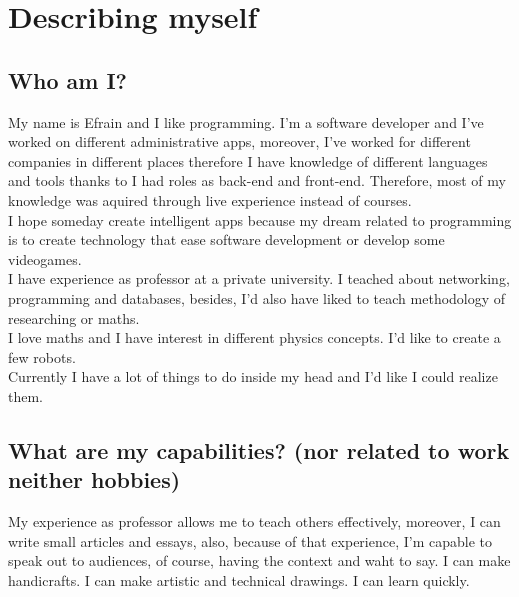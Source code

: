 \section{Describing myself}

\subsection{Who am I?}
\begin{multicols}{2}
My name is Efrain and I like programming. I'm a software developer and I've worked on different administrative apps, moreover, I've worked for different companies in different places therefore I have knowledge of different languages and tools thanks to I had roles as back-end and front-end. Therefore, most of my knowledge was aquired through live experience instead of courses.\\
I hope someday create intelligent apps because my dream related to programming is to create technology that ease software development or develop some videogames.\\
I have experience as professor at a private university. I teached about networking, programming and databases, besides, I'd also have liked to teach methodology of researching or maths.\\
I love maths and I have interest in different physics concepts. I'd like to create a few robots.\\
Currently I have a lot of things to do inside my head and I'd like I could realize them.
\end{multicols}

\subsection{What are my capabilities? (nor related to work neither hobbies)}
\begin{multicols}{2}
My experience as professor allows me to teach others effectively, moreover, I can write small articles and essays, also, because of that experience, I'm capable to speak out to audiences, of course, having the context and waht to say. I can make handicrafts. I can make artistic and technical drawings. I can learn quickly.
\end{multicols}

